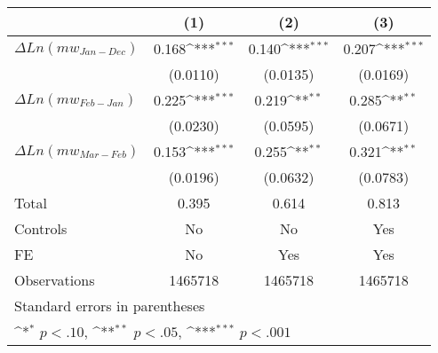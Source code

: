 {
\def\sym#1{\ifmmode^{#1}\else\(^{#1}\)\fi}
\begin{tabular}{l*{3}{c}}
\hline\hline
                    &\multicolumn{1}{c}{(1)}&\multicolumn{1}{c}{(2)}&\multicolumn{1}{c}{(3)}\\
\hline
$\Delta Ln(mw_{Jan-Dec}) $&       0.168\sym{***}&       0.140\sym{***}&       0.207\sym{***}\\
                    &    (0.0110)         &    (0.0135)         &    (0.0169)         \\
[1em]
$\Delta Ln(mw_{Feb-Jan}) $&       0.225\sym{***}&       0.219\sym{**} &       0.285\sym{**} \\
                    &    (0.0230)         &    (0.0595)         &    (0.0671)         \\
[1em]
$\Delta Ln(mw_{Mar-Feb}) $&       0.153\sym{***}&       0.255\sym{**} &       0.321\sym{**} \\
                    &    (0.0196)         &    (0.0632)         &    (0.0783)         \\
\hline
Total & 0.395 & 0.614 & 0.813 \\
Controls & No & No & Yes \\
FE & No & Yes & Yes \\
Observations        &     1465718         &     1465718         &     1465718         \\
\hline\hline
\multicolumn{4}{l}{\footnotesize Standard errors in parentheses}\\
\multicolumn{4}{l}{\footnotesize \sym{*} \(p<.10\), \sym{**} \(p<.05\), \sym{***} \(p<.001\)}\\
\end{tabular}
}
